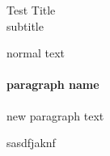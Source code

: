 \documentclass[12pt,a4paper,twoside]{article}
\begin{document}
    \begin{center}
        \Huge
        Test Title\\[10mm]

        \large
        subtitle\\[1mm]

    \end{center}

    \normalsize
    normal text

    \paragraph{paragraph name}

    new paragraph text

    sasdfjaknf
\end{document}
